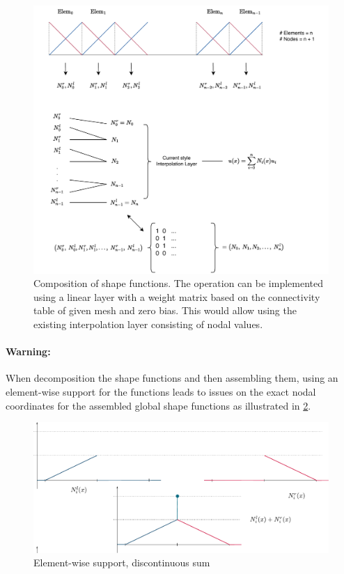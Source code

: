 \documentclass{article}
\begin{document}
\begin{figure}[bpt]
    \centering
    \includegraphics[width = 0.8\linewidth]{Schema/Diagram_NN_elementwise.drawio.pdf}
    \caption{Composition of shape functions.  The operation can be implemented using a linear layer with a weight matrix based on the connectivity table of given mesh and zero bias. This would allow using the existing interpolation layer consisting of nodal values.}
    \label{fig:assembly}
\end{figure}

\paragraph{Warning:}
When decomposition the shape functions and then assembling them, using an element-wise support for the functions leads to issues on the exact nodal coordinates for the assembled global shape functions as illustrated in \cref{fig:Discontinuous}.

\begin{figure}[hbpt]
    \centering
    \includegraphics[width=\linewidth]{Schema/Discontinuous_sum.pdf}
    \caption{Element-wise support, discontinuous sum}
    \label{fig:Discontinuous}
\end{figure}
\end{document}
